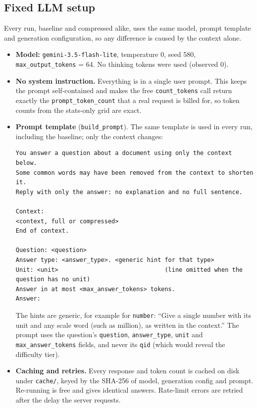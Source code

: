 \documentclass[11pt]{article}
\newcommand{\code}[1]{\texttt{#1}}
\begin{document}
\subsection{Fixed LLM setup}
Every run, baseline and compressed alike, uses the same model, prompt template and generation
configuration, so any difference is caused by the context alone.
\begin{itemize}
  \item \textbf{Model:} \code{gemini-3.5-flash-lite}, temperature 0, seed 580,
        \code{max\_output\_tokens} = 64. No thinking tokens were used (observed 0).
  \item \textbf{No system instruction.} Everything is in a single user prompt. This keeps the
        prompt self-contained and makes the free \code{count\_tokens} call return exactly the
        \code{prompt\_token\_count} that a real request is billed for, so token counts from the
        stats-only grid are exact.
  \item \textbf{Prompt template} (\code{build\_prompt}). The same template is used in every run,
        including the baseline; only the context changes:
\begin{lstlisting}
You answer a question about a document using only the context below.
Some common words may have been removed from the context to shorten it.
Reply with only the answer: no explanation and no full sentence.

Context:
<context, full or compressed>
End of context.

Question: <question>
Answer type: <answer_type>. <generic hint for that type>
Unit: <unit>                              (line omitted when the question has no unit)
Answer in at most <max_answer_tokens> tokens.
Answer:
\end{lstlisting}
        The hints are generic, for example for \code{number}: ``Give a single number with its unit
        and any scale word (such as million), as written in the context.'' The prompt uses the
        question's \code{question}, \code{answer\_type}, \code{unit} and \code{max\_answer\_tokens}
        fields, and never its \code{qid} (which would reveal the difficulty tier).
  \item \textbf{Caching and retries.} Every response and token count is cached on disk under
        \code{cache/}, keyed by the SHA-256 of model, generation config and prompt. Re-running is
        free and gives identical answers. Rate-limit errors are retried after the delay the server
        requests.
\end{itemize}
\end{document}
